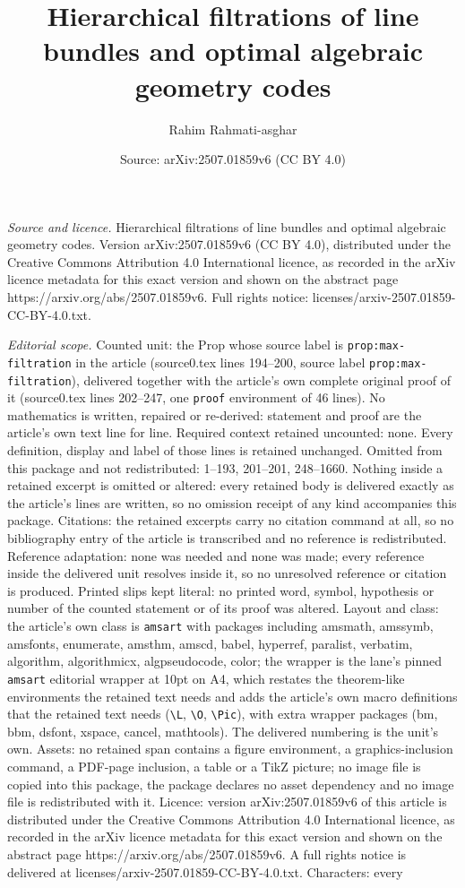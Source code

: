 \documentclass[10pt,a4paper]{amsart}
\title[Hierarchical filtrations of line bundles and optimal algebra]{Hierarchical filtrations of line bundles and optimal algebraic geometry codes}
\author{Rahim Rahmati-asghar}
\date{Source: arXiv:2507.01859v6 (CC BY 4.0)}
\begin{document}
\maketitle

\noindent\emph{Source and licence.} Hierarchical filtrations of line bundles and optimal algebraic geometry codes. Version arXiv:2507.01859v6 (CC BY 4.0), distributed under the Creative Commons Attribution 4.0 International licence, as recorded in the arXiv licence metadata for this exact version and shown on the abstract page https://arxiv.org/abs/2507.01859v6. Full rights notice: licenses/arxiv-2507.01859-CC-BY-4.0.txt.\par\smallskip

\noindent\textit{Editorial scope.} Counted unit: the Prop whose source label is \texttt{prop:max-filtration} in the article (source0.tex lines 194--200, source label \texttt{prop:max-filtration}), delivered together with the article's own complete original proof of it (source0.tex lines 202--247, one \texttt{proof} environment of 46 lines). No mathematics is written, repaired or re-derived: statement and proof are the article's own text line for line. Required context retained uncounted: none. Every definition, display and label of those lines is retained unchanged. Omitted from this package and not redistributed: 1--193, 201--201, 248--1660. Nothing inside a retained excerpt is omitted or altered: every retained body is delivered exactly as the article's lines are written, so no omission receipt of any kind accompanies this package. Citations: the retained excerpts carry no citation command at all, so no bibliography entry of the article is transcribed and no reference is redistributed. Reference adaptation: none was needed and none was made; every reference inside the delivered unit resolves inside it, so no unresolved reference or citation is produced. Printed slips kept literal: no printed word, symbol, hypothesis or number of the counted statement or of its proof was altered. Layout and class: the article's own class is \texttt{amsart} with packages including amsmath, amssymb, amsfonts, enumerate, amsthm, amscd, babel, hyperref, paralist, verbatim, algorithm, algorithmicx, algpseudocode, color; the wrapper is the lane's pinned \texttt{amsart} editorial wrapper at 10pt on A4, which restates the theorem-like environments the retained text needs and adds the article's own macro definitions that the retained text needs (\texttt{\textbackslash L}, \texttt{\textbackslash O}, \texttt{\textbackslash Pic}), with extra wrapper packages (bm, bbm, dsfont, xspace, cancel, mathtools). The delivered numbering is the unit's own. Assets: no retained span contains a figure environment, a graphics-inclusion command, a PDF-page inclusion, a table or a TikZ picture; no image file is copied into this package, the package declares no asset dependency and no image file is redistributed with it. Licence: version arXiv:2507.01859v6 of this article is distributed under the Creative Commons Attribution 4.0 International licence, as recorded in the arXiv licence metadata for this exact version and shown on the abstract page https://arxiv.org/abs/2507.01859v6. A full rights notice is delivered at licenses/arxiv-2507.01859-CC-BY-4.0.txt. Characters: every 
\end{document}
